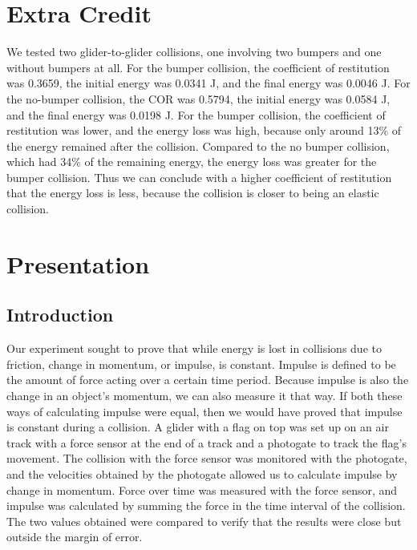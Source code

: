 \documentclass[11pt]{report}
\begin{document}
\section*{Extra Credit}
We tested two glider-to-glider collisions, one involving two bumpers and one
without bumpers at all.  For the bumper collision, the coefficient of
restitution was 0.3659, the initial energy was 0.0341 J, and the final energy
was 0.0046 J.  For the no-bumper collision, the COR was 0.5794, the initial
energy was 0.0584 J, and the final energy was 0.0198 J.  For the bumper
collision, the coefficient of restitution was lower, and the energy loss was
high, because only around 13\% of the energy remained after the collision.
Compared to the no bumper collision, which had 34\% of the remaining energy,  
the energy loss was greater for the bumper collision.  Thus we can conclude with
a higher coefficient of restitution that the energy loss is less, because the
collision is closer to being an elastic collision.

\section*{Presentation}

\subsection*{Introduction}
Our experiment sought to prove that while energy is lost in collisions due to
friction, change in momentum, or impulse, is constant.  Impulse is defined to be
the amount of force acting over a certain time period.  Because impulse is also the
change in an object's momentum, we can also measure it that way.  If both these
ways of calculating impulse were equal, then we would have proved that impulse
is constant during a collision.  A glider with a flag on top was set up on an
air track with a force sensor at the end of a track and a photogate to track the
flag's movement.  The collision with the force sensor was monitored with the
photogate, and the velocities obtained by the photogate allowed us to calculate
impulse by change in momentum.  Force over time was measured with the force
sensor, and impulse was calculated by summing the force in the time interval of
the collision.  The two values obtained were compared to verify that the results
were close but outside the margin of error.
\end{document}
